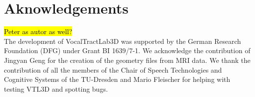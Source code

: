 \documentclass[]{article}
\begin{document}
	\section{Aknowledgements}
	
	\hl{Peter as autor as well?} \\
	
	The development of VocalTractLab3D was supported by the German Research Foundation (DFG) under Grant BI 1639/7-1.
	We acknowledge the contribution of Jingyan Geng for the creation of the geometry files 
	from MRI data.
	We thank the contribution of all the members of the Chair of Speech Technologies and Cognitive Systems of the TU-Dresden and Mario Fleischer for helping with testing VTL3D 
	and spotting bugs.
	
	\printbibliography
\end{document}
